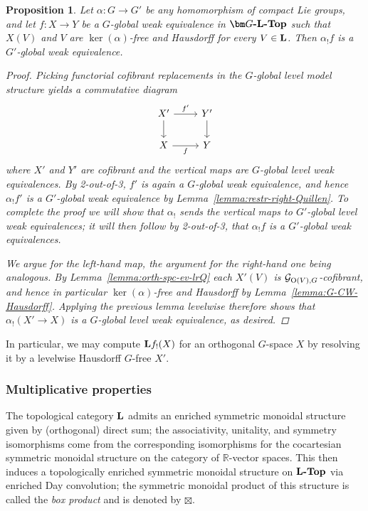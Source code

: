 \documentclass[reqno]{memo-l}
\theoremstyle{mythm}
\newtheorem{prop}[thm]{Proposition}
\theoremstyle{definition}
\numberwithin{equation}{section}
\newcommand{\R} {{\mathbb{R}}}
\newcommand{\cat}[1]{\textbf{\textup{#1}}}
\renewcommand{\O}{{\textup{O}}}
\begin{document}
\begin{prop}\label{prop:quotient-we-global}
    Let $\alpha\colon G\to G'$ be any homomorphism of compact Lie groups, and let $f\colon X\to Y$ be a $G$-global weak equivalence in $\cat{$\bm G$-$\cat{L}$-Top}$ such that $X(V)$ and $V$ are $\ker(\alpha)$-free and Hausdorff for every $V\in\cat{L}$. Then $\alpha_!f$ is a $G'$-global weak equivalence.
    \begin{proof}
        Picking functorial cofibrant replacements in the $G$-global level model structure yields a commutative diagram
        \[
            \begin{tikzcd}
                X'\arrow[r,"f'"]\arrow[d] & Y'\arrow[d]\\
                X\arrow[r,"f"'] & Y
            \end{tikzcd}
        \]
        where $X'$ and $Y'$ are cofibrant and the vertical maps are $G$-global level weak equivalences. By 2-out-of-3, $f'$ is again a $G$-global weak equivalence, and hence $\alpha_!f'$ is a $G'$-global weak equivalence by Lemma~\ref{lemma:restr-right-Quillen}. To complete the proof we will show that $\alpha_!$ sends the vertical maps to $G'$-global level weak equivalences; it will then follow by 2-out-of-3, that $\alpha_!f$ is a $G'$-global weak equivalences.
        
        We argue for the left-hand map, the argument for the right-hand one being analogous. By Lemma~\ref{lemma:orth-spc-ev-lrQ} each $X'(V)$ is $\mathcal G_{\O(V),G}$-cofibrant, and hence in particular $\ker(\alpha)$-free and Hausdorff by Lemma~\ref{lemma:G-CW-Hausdorff}. Applying the previous lemma levelwise therefore shows that $\alpha_!(X'\to X)$ is a $G$-global level weak equivalence, as desired.
    \end{proof}
\end{prop}

In particular, we may compute $\cat{L}f_!(X)$ for an orthogonal  $G$-space $X$ by resolving it by a levelwise Hausdorff $G$-free $X'$.

\medskip
\subsubsection{Multiplicative properties} 
The topological category $\cat{L}$ admits an enriched symmetric monoidal structure given by (orthogonal) direct sum; the associativity, unitality, and symmetry isomorphisms come from the corresponding isomorphisms for the cocartesian symmetric monoidal structure on the category of $\R$-vector spaces. This then induces a topologically enriched symmetric monoidal structure on $\cat{$\cat{L}$-Top}$ via enriched Day convolution; the symmetric monoidal product of this structure is called the \emph{box product} and is denoted by $\boxtimes$.
\end{document}
